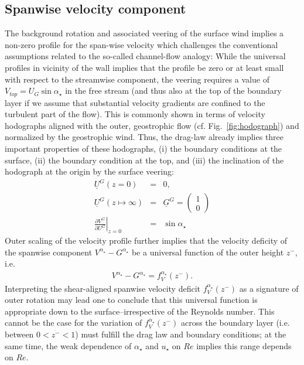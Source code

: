 \documentclass[a4paper,11pt]{amsart}
\begin{document}
\subsection{Spanwise velocity component}
\label{sec:spanwise} 
%
%
The background rotation and associated veering of the surface wind implies a non-zero profile for the span-wise
velocity which challenges the conventional assumptions related to the so-called channel-flow analogy:
%
While the universal profiles in vicinity of the wall implies that the profile be zero or at least small with respect to the streamwise
component, the veering requires a value of $V_{top}=U_G\sin\alpha_\star$ in the free stream (and thus also at the top of the boundary layer if we assume
that substantial velocity gradients are confined to the turbulent part of the flow). 
%
This is commonly shown in terms of velocity hodographs aligned with the outer, geostrophic flow (cf. Fig.~\ref{fig:hodograph}) and normalized by
the geostrophic wind. 
%
Thus, the drag-law already implies three important properties of these hodographs,
(i) the boundary conditions at the surface,
(ii) the boundary condition at the top, and
(iii) the inclination of the hodograph at the origin by the surface veering:
\begin{subequations} 
\begin{eqnarray} 
 \underline{U}^{G}(z=0) &=& 0,\\ 
 \underline{U}^{G}(z\mapsto\infty) &=& \underline{G}^G = \left(\begin{array}{c}1\\0\end{array}\right) \\
   \left.\frac{\partial V^G}{\partial U^G}\right|_{z=0} &=& \sin\alpha_\star
\end{eqnarray} 
\end{subequations} 
%
Outer scaling of the velocity profile further implies that the velocity deficity of the spanwise component $V^{\alpha_\star}-G^{\alpha_\star}$
be a universal function of the outer height $z^-$, i.e.  
\begin{eqnarray}
  V^{\alpha_\star}-G^{\alpha_\star} = f^{\alpha_\star}_V(z^-).  
\end{eqnarray}
%
Interpreting the shear-aligned spanwise velocity deficit $f_{V}^{\alpha_\star}(z^-)$ as 
a signature of outer rotation may lead one to conclude that this universal function
is appropriate down to the surface--irrespective of the Reynolds number.
%
This cannot be the case for the variation of $f_{V}^{\alpha_\star}(z^-)$ across the boundary layer (i.e. between $0<z^-<1$)
must fulfill the drag law and boundary conditions;
at the same time, the weak dependence of $\alpha_\star$ and $u_\star$ on $Re$ implies this range depends on $Re$.
%
%
\end{document}
